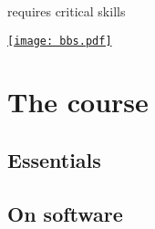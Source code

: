 \documentclass[t]{beamer}
\begin{document}
  \begin{frame}[t]{ requires critical skills}

    \href{http://www2.psych.ubc.ca/~henrich/pdfs/WeirdPeople.pdf}{\texttt{[image: bbs.pdf]}}

  \end{frame}

  \begin{frame}[c, plain]{}


  \end{frame}

  \section{The course}

  \subsection{Essentials}

  \subsection{On software}
\end{document}
